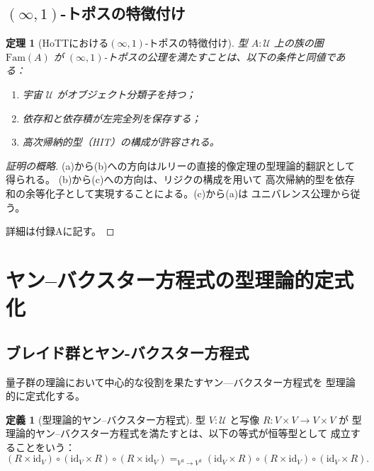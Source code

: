 \documentclass[12pt,a4paper]{article}
\newtheorem{theorem}{定理}[section]
\theoremstyle{definition}
\newtheorem{definition}{定義}[section]
\begin{document}
\subsection{$(\infty,1)$-トポスの特徴付け}

\begin{theorem}[HoTTにおける$(\infty,1)$-トポスの特徴付け]\label{thm:topos}
型 $A : \mathcal{U}$ 上の族の圏 $\mathrm{Fam}(A)$ が
$(\infty,1)$-トポスの公理を満たすことは、以下の条件と同値である：
\begin{enumerate}[label=(\alph*)]
  \item 宇宙 $\mathcal{U}$ がオブジェクト分類子を持つ；
  \item 依存和と依存積が左完全列を保存する；
  \item 高次帰納的型（HIT）の構成が許容される。
\end{enumerate}
\end{theorem}

\begin{proof}[証明の概略]
(a)から(b)への方向はルリーの直接的像定理の型理論的翻訳として得られる。
(b)から(c)への方向は、リジクの構成\cite{rijke2017join}を用いて
高次帰納的型を依存和の余等化子として実現することによる。(c)から(a)は
ユニバレンス公理から従う。

詳細は付録Aに記す。
\end{proof}


\section{ヤン--バクスター方程式の型理論的定式化}

\subsection{ブレイド群とヤン-バクスター方程式}

量子群の理論において中心的な役割を果たすヤン—バクスター方程式を
型理論的に定式化する。

\begin{definition}[型理論的ヤン--バクスター方程式]
型 $V : \mathcal{U}$ と写像 $R : V \times V \to V \times V$ が
型理論的ヤン--バクスター方程式を満たすとは、以下の等式が恒等型として
成立することをいう：
\begin{equation}\label{eq:ybe}
  (R \times \mathrm{id}_V) \circ (\mathrm{id}_V \times R) \circ
  (R \times \mathrm{id}_V) =_{V^3 \to V^3}
  (\mathrm{id}_V \times R) \circ (R \times \mathrm{id}_V) \circ
  (\mathrm{id}_V \times R).
\end{equation}
\end{definition}
\end{document}
